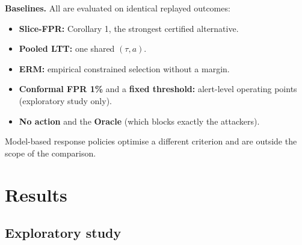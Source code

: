 \textbf{Baselines.} All are evaluated on identical replayed outcomes:

\begin{itemize}
\tightlist
\item
  \textbf{Slice-FPR:} Corollary 1, the strongest certified alternative.
\item
  \textbf{Pooled LTT:} one shared \((\tau,a)\).
\item
  \textbf{ERM:} empirical constrained selection without a margin.
\item
  \textbf{Conformal FPR 1\%} and a \textbf{fixed threshold:} alert-level
  operating points (exploratory study only).
\item
  \textbf{No action} and the \textbf{Oracle} (which blocks exactly the
  attackers).
\end{itemize}

Model-based response policies \cite{hammar2022optimalstopping} optimise
a different criterion and are outside the scope of the comparison.

\hypertarget{sec:results}{%
\section{Results}\label{sec:results}}

\hypertarget{exploratory-study}{%
\subsection{Exploratory study}\label{exploratory-study}}

